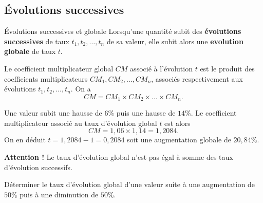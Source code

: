 \documentclass[11pt]{article}
\begin{document}
\subsection{Évolutions successives}
\begin{defi}{Évolutions successives et globale}
  Lorsqu'une quantité subit des \textbf{évolutions successives} de taux $t_1,
  t_2, \dots, t_n$ de sa valeur, elle subit alors une \textbf{evolution globale}
  de taux $t$.
\end{defi}
\begin{prop}
  Le coefficient multiplicateur global $CM$ associé à l'évolution $t$ est le
  produit des coefficients multiplicateurs $CM_1, CM_2, \dots, CM_n$, associés
  respectivement aux évolutions $t_1, t_2, \dots, t_n$. On a
  \[
    CM = CM_1\times CM_2\times\dots\times CM_n.
  \]
  \begin{center}
\end{center}

\end{prop}
\begin{exemple}
  Une valeur subit une hausse de $6\%$ puis une hausse de $14$\%. Le coefficient
  multiplicateur associé au taux d'évolution global $t$ est alors
  \[
    CM = 1,06\times1,14=1,2084.
  \]
  On en déduit $t=1,2084-1=0,2084$ soit une augmentation globale de $20,84\%$.
\end{exemple}
\begin{rmq}
  \textbf{Attention !} Le taux d'évolution global n'est pas égal à somme des
  taux d'évolution successifs.
\end{rmq}
\begin{app}
  Déterminer le taux d'évolution global d'une valeur suite à une augmentation de
  $50\%$ puis à une diminution de $50\%$.
\end{app}
\end{document}

